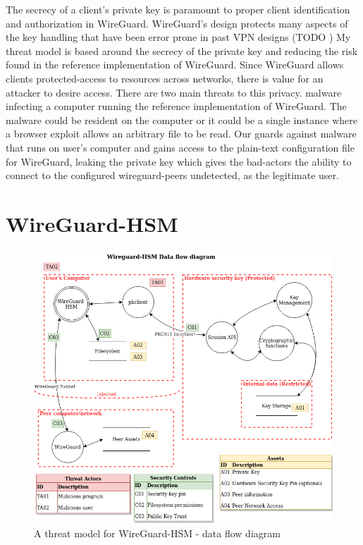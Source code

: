 \documentclass [11pt, proquest] {uwthesis}[2020/02/24]
\begin{document}
The secrecy of a client's private key is paramount to proper client identification and authorization in WireGuard. WireGuard's design protects many aspects of the key handling that have been error prone in past VPN designs (TODO )
My threat model is based around the secrecy of the private key and reducing the risk found in the reference implementation of WireGuard. Since WireGuard allows clients protected-access to resources across networks, there is value for an attacker to desire access. 
There are two main threats to this privacy.  malware infecting a computer running the reference implementation of WireGuard. The malware could be resident on the computer or it could be a single instance where a browser exploit allows an arbitrary file to be read. Our guards against malware that runs on user's computer and gains access to the plain-text configuration file for WireGuard, leaking the private key which gives the bad-actors the ability to connect to the configured wireguard-peers undetected, as the legitimate user.

\section{WireGuard-HSM}
\begin{figure}[ht]
\includegraphics[width=14cm]{paper/images/WGHSM_DFD_preFB.drawio.png}
\caption{A threat model for WireGuard-HSM - data flow diagram}
\label{fig:wg_hsm_dfd}
\end{figure}
\end{document}
